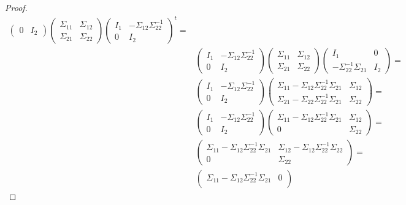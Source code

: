 \documentclass[12pt, a4paper]{article}
\numberwithin{equation}{section}
\begin{document}
\begin{proof}
\begin{align}
\begin{pmatrix}
0   & I_2
\end{pmatrix}
\begin{pmatrix}
\Sigma_{11} & \Sigma_{12} \\
\Sigma_{21} & \Sigma_{22}
\end{pmatrix}
\begin{pmatrix}
I_1 & -\Sigma_{12}\Sigma_{22}^{-1} \\
0   & I_2
\end{pmatrix}^t=
\\
&\begin{pmatrix}
I_1 & -\Sigma_{12}\Sigma_{22}^{-1} \\
0   & I_2
\end{pmatrix}
\begin{pmatrix}
\Sigma_{11} & \Sigma_{12} \\
\Sigma_{21} & \Sigma_{22}
\end{pmatrix}
\begin{pmatrix}
I_1 & 0 \\
-\Sigma_{22}^{-1}\Sigma_{21} & I_2
\end{pmatrix}=
\\
&\begin{pmatrix}
I_1 & -\Sigma_{12}\Sigma_{22}^{-1} \\
0   & I_2
\end{pmatrix}
\begin{pmatrix}
\Sigma_{11}-\Sigma_{12}\Sigma_{22}^{-1}\Sigma_{21} & \Sigma_{12} \\
\Sigma_{21}-\Sigma_{22}\Sigma_{22}^{-1}\Sigma_{21} & \Sigma_{22}
\end{pmatrix}=
\\
&\begin{pmatrix}
I_1 & -\Sigma_{12}\Sigma_{22}^{-1} \\
0   & I_2
\end{pmatrix}
\begin{pmatrix}
\Sigma_{11}-\Sigma_{12}\Sigma_{22}^{-1}\Sigma_{21} & \Sigma_{12} \\
0 & \Sigma_{22}
\end{pmatrix}=
\\
&\begin{pmatrix}
\Sigma_{11}-\Sigma_{12}\Sigma_{22}^{-1}\Sigma_{21} & \Sigma_{12}-\Sigma_{12}\Sigma_{22}^{-1}\Sigma_{22} \\
0 & \Sigma_{22}
\end{pmatrix}=
\\
&\begin{pmatrix}
\Sigma_{11}-\Sigma_{12}\Sigma_{22}^{-1}\Sigma_{21} & 0 \\

\end{pmatrix}
\end{align}
\end{proof}
\end{document}
